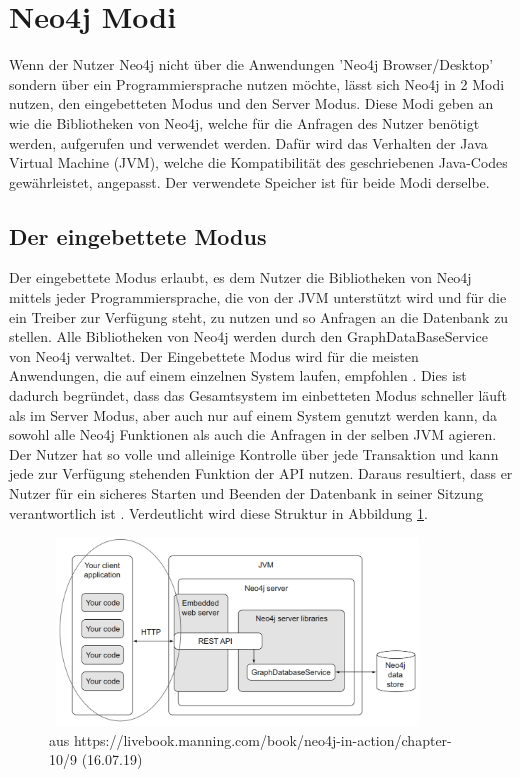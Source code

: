 \section {Neo4j Modi}
Wenn der Nutzer Neo4j nicht über die Anwendungen 'Neo4j Browser/Desktop' sondern über ein Programmiersprache nutzen möchte,  lässt sich Neo4j in 2 Modi nutzen, den eingebetteten Modus und den Server Modus. Diese Modi geben an wie die Bibliotheken von Neo4j, welche für die Anfragen des Nutzer benötigt werden, aufgerufen und verwendet werden. Dafür wird das Verhalten der Java Virtual Machine (JVM), welche die Kompatibilität des geschriebenen Java-Codes gewährleistet, angepasst. Der verwendete Speicher ist für beide Modi derselbe.

\subsection{Der eingebettete Modus}
Der eingebettete Modus erlaubt, es dem Nutzer die  Bibliotheken von Neo4j mittels jeder Programmiersprache, die von der JVM unterstützt wird und für die ein Treiber zur Verfügung steht, zu nutzen und so Anfragen an die Datenbank zu stellen. Alle Bibliotheken von Neo4j werden durch den GraphDataBaseService von Neo4j verwaltet. Der Eingebettete Modus wird für die meisten Anwendungen, die auf einem einzelnen System laufen, empfohlen \parencite{raj2015neo4j}. Dies ist dadurch begründet, dass das Gesamtsystem im einbetteten Modus schneller läuft als im Server Modus, aber auch nur auf einem System genutzt werden kann, da sowohl alle Neo4j Funktionen als auch die Anfragen in der selben JVM agieren. Der Nutzer hat so volle und alleinige Kontrolle über jede Transaktion und kann jede zur Verfügung stehenden Funktion der API nutzen. Daraus resultiert, dass er Nutzer für ein sicheres Starten und Beenden der Datenbank in seiner Sitzung verantwortlich ist \parencite{robinson2013graph}.  Verdeutlicht wird diese Struktur in Abbildung \ref{fig:Embedded}.
\begin{figure}[!htb]
	\centering	
	\includegraphics [width=10cm, height=5cm]{Figures/embedded}
	\caption[Eingebetteter Modus]{aus https://livebook.manning.com/book/neo4j-in-action/chapter-10/9 (16.07.19)}
	\label{fig:Embedded}
\end{figure}

